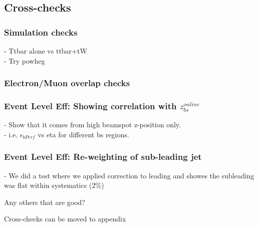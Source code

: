 \FloatBarrier
\newpage

\subsection{Cross-checks}
\subsubsection{Simulation checks}
- Ttbar alone vs ttbar+tW\\
- Try powheg
\subsubsection{Electron/Muon overlap checks}
\subsubsection{Event Level Eff: Showing correlation with $z_{bs}^{online}$}
- Show that it comes from high beamspot z-position only.\\
- i.e. $\epsilon_{bPerf}$ vs eta for different bs regions.
\subsubsection{Event Level Eff: Re-weighting of sub-leading jet}
- We did a test where we applied correction to leading and showes the subleading was flat within systematics (2\%)

Any others that are good?

Cross-checks can be moved to appendix
